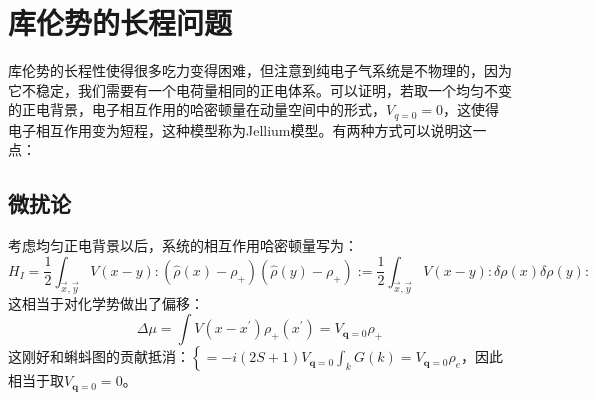 \documentclass[10pt,openany]{book}
\theoremstyle{thmstyle} %
\theoremstyle{defstyle} %
\theoremstyle{prostyle} %
\begin{document}
\section{库伦势的长程问题}
库伦势的长程性使得很多吃力变得困难，但注意到纯电子气系统是不物理的，因为它不稳定，我们需要有一个电荷量相同的正电体系。可以证明，若取一个均匀不变的正电背景，电子相互作用的哈密顿量在动量空间中的形式，$ V_{q=0}=0 $，这使得电子相互作用变为短程，这种模型称为Jellium模型。有两种方式可以说明这一点：
\subsection*{微扰论}
考虑均匀正电背景以后，系统的相互作用哈密顿量写为：
\begin{equation}
	H_I=\frac{1}{2} \int_{\vec{x}, \vec{y}} V(x-y):\left(\hat{\rho}(x)-\rho_{+}\right)\left(\hat{\rho}(y)-\rho_{+}\right):=\frac{1}{2} \int_{\vec{x}, \vec{y}} V(x-y): \delta \rho(x) \delta \rho(y):
\end{equation} 
这相当于对化学势做出了偏移：
\begin{equation}
	\Delta \mu=\int V\left(x-x^{\prime}\right) \rho_{+}\left(x^{\prime}\right)=V_{\mathbf{q}=0} \rho_{+}
\end{equation}
这刚好和蝌蚪图的贡献抵消：$ \left\{=-i(2 S+1) V_{\mathbf{q}=0} \int_k G(k)=V_{\mathbf{q}=0} \rho_e\right.  $，因此相当于取$ V_{\mathbf{q}=0}=0 $。
\end{document}

